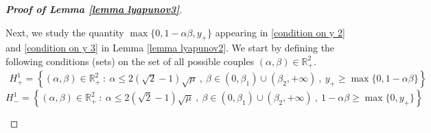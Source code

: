 \documentclass[reqno]{amsart}
\theoremstyle{plain}
\theoremstyle{definition}
\theoremstyle{remark}
\newcommand{\R}{\mathbb{R}}	%
\begin{document}
\begin{proof}[\textbf{Proof of Lemma \ref{lemma lyapunov3}}]
\begin{itemize}[wide=0pt]
\begin{itemize}[wide=5pt]
			Next, we study the quantity $\max\{0,1-\alpha\beta,y_{+}\}$ appearing in \eqref{condition on y 2} and \eqref{condition on y 3} in Lemma \ref{lemma lyapunov2}. We start by defining the following conditions (sets) on the set of all possible couples $(\alpha,\beta)\in \R_{+}^{2}$.
			\begin{equation}\label{H1plus}
				\begin{aligned}
					H_{+}^{1}  =\left\{(\alpha,\beta)\in \R_{+}^{2}~:~ \alpha\leq 2(\sqrt{2}-1)\sqrt{\mu} ~,~ \beta\in (0,\beta_{1})\cup(\beta_{2},+\infty) ~,~ y_{+}\geq \max\{0,1-\alpha\beta\}\right\}	
				\end{aligned}
			\end{equation}
			\begin{equation}\label{H1min}
				H_{-}^{1} =  \left\{(\alpha,\beta)\in \R_{+}^{2}~:~ \alpha\leq 2(\sqrt{2}-1)\sqrt{\mu} ~,~ \beta\in (0,\beta_{1})\cup(\beta_{2},+\infty) ~,~ 1-\alpha\beta\geq \max\{0,y_{+}\}\right\}
			\end{equation}
			

\end{itemize}
\end{itemize}
\end{proof}
\end{document}
